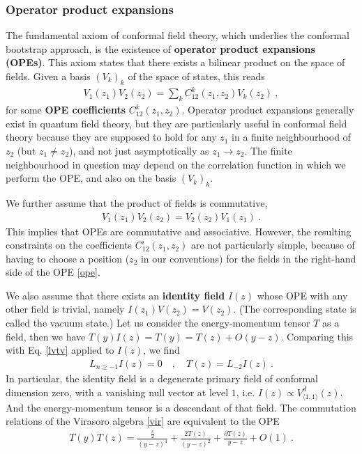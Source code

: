\documentclass[12pt, a4paper]{article}
\theoremstyle{break}
\begin{document}
\subsubsection{Operator product expansions}\label{sec:ope}

The fundamental axiom of conformal field theory, which underlies the conformal bootstrap approach, is the existence of \textbf{operator product expansions (OPEs)}. This axiom states that there exists a bilinear product on the space of fields. Given a basis $(V_k)_k$ of the space of states, this reads 
\begin{align}
  \boxed{V_1(z_1)V_2(z_2) = \sum_k C^k_{12}(z_1,z_2) V_k(z_2)}\ ,
  \label{ope}
 \end{align}
for some \textbf{OPE coefficients} $C^k_{12}(z_1,z_2)$. Operator product expansions generally exist in quantum field theory, but they are particularly useful in conformal field theory because they are supposed to hold for any $z_1$ in a finite neighbourhood of $z_2$ (but $z_1\neq z_2$), and not just asymptotically as $z_1\to z_2$. The finite neighbourhood in question may depend on the correlation function in which we perform the OPE, and also on the basis $(V_k)_k$. 

We further assume that the product of fields is commutative,
\begin{align}
 \boxed{V_1(z_1)V_2(z_2) = V_2(z_2)V_1(z_1)}\ .
 \label{comm}
\end{align}
This implies that OPEs are commutative and associative. However, the resulting constraints on the coefficients $C^i_{12}(z_1,z_2)$ are not particularly simple, because of having to choose a position ($z_2$ in our conventions) for the fields in the right-hand side of the OPE \eqref{ope}. 

We also assume that there exists an \textbf{identity field} $I(z)$ whose OPE with any other field is trivial, namely $I(z_1)V(z_2) = V(z_2)$. (The corresponding state is called the vacuum state.) Let us consider the energy-momentum tensor $T$ as a field, then we have 
$
 T(y)I(z) = T(y) = T(z)  + O(y-z)
$. 
Comparing this with Eq. \eqref{lvtv} applied to $I(z)$, we find 
\begin{align}
 L_{n\geq -1} I(z) = 0 \quad , \quad T(z) = L_{-2}I(z)\ .
\end{align}
In particular, the identity field is a degenerate primary field of conformal dimension zero, with a vanishing null vector at level $1$, i.e. $I(z) \propto V^d_{\langle 1,1\rangle}(z)$. And the energy-momentum tensor is a descendant of that field. The commutation relations of the Virasoro algebra \eqref{vir} are equivalent to the OPE
\begin{align}
 T(y)T(z) = \frac{\frac{c}{2}}{(y-z)^4} + \frac{2T(z)}{(y-z)^2} + \frac{\partial T(z)}{y-z} + O(1)\ .
\label{tt}
\end{align}
\end{document}
